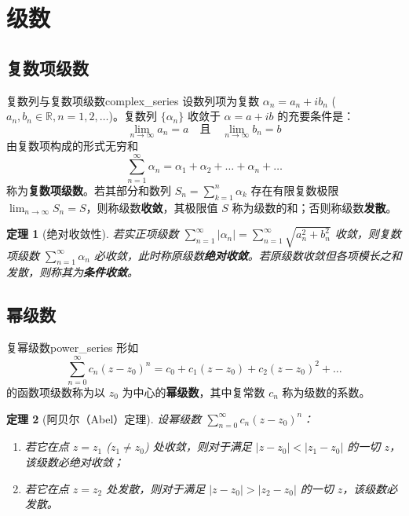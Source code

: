 \documentclass[11pt,a4paper,fontset=fandol]{ctexart}
\newtheorem{theorem}{定理}[section]
\theoremstyle{remark}
\begin{document}
\section{级数}

\subsection{复数项级数}

\begin{definition}{复数列与复数项级数}{complex_series}
设数列项为复数 $\alpha_n = a_n + i b_n$ ($a_n, b_n \in \mathbb{R}, n = 1, 2, \dots$)。复数列 $\{\alpha_n\}$ 收敛于 $\alpha = a + ib$ 的充要条件是：
\begin{equation}
    \lim_{n \to \infty} a_n = a \quad \text{且} \quad \lim_{n \to \infty} b_n = b
\end{equation}
由复数项构成的形式无穷和
\begin{equation}
    \sum_{n=1}^\infty \alpha_n = \alpha_1 + \alpha_2 + \dots + \alpha_n + \dots
\end{equation}
称为\textbf{复数项级数}。若其部分和数列 $S_n = \sum_{k=1}^n \alpha_k$ 存在有限复数极限 $\lim_{n \to \infty} S_n = S$，则称级数\textbf{收敛}，其极限值 $S$ 称为级数的和；否则称级数\textbf{发散}。
\end{definition}

\begin{theorem}[绝对收敛性]
若实正项级数 $\sum_{n=1}^\infty |\alpha_n| = \sum_{n=1}^\infty \sqrt{a_n^2 + b_n^2}$ 收敛，则复数项级数 $\sum_{n=1}^\infty \alpha_n$ 必收敛，此时称原级数\textbf{绝对收敛}。若原级数收敛但各项模长之和发散，则称其为\textbf{条件收敛}。
\end{theorem}

\subsection{幂级数}

\begin{definition}{复幂级数}{power_series}
形如
\begin{equation}
    \sum_{n=0}^\infty c_n (z - z_0)^n = c_0 + c_1(z - z_0) + c_2(z - z_0)^2 + \dots
\end{equation}
的函数项级数称为以 $z_0$ 为中心的\textbf{幂级数}，其中复常数 $c_n$ 称为级数的系数。
\end{definition}

\begin{theorem}[阿贝尔（Abel）定理]
设幂级数 $\sum_{n=0}^\infty c_n (z - z_0)^n$：
\begin{enumerate}
    \item 若它在点 $z = z_1$ ($z_1 \neq z_0$) 处收敛，则对于满足 $|z - z_0| < |z_1 - z_0|$ 的一切 $z$，该级数必绝对收敛；
    \item 若它在点 $z = z_2$ 处发散，则对于满足 $|z - z_0| > |z_2 - z_0|$ 的一切 $z$，该级数必发散。
\end{enumerate}
\end{theorem}
\end{document}

